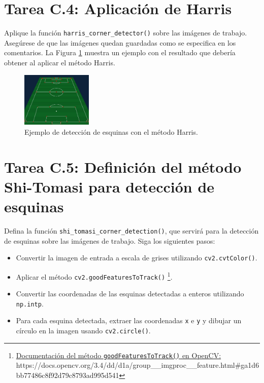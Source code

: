 \section*{Tarea C.4: Aplicación de Harris}
Aplique la función \texttt{harris\_corner\_detector()} sobre las imágenes de trabajo. Asegúrese de que las imágenes quedan guardadas como se especifica en los comentarios. La Figura \ref{fig:ejemplo_harris} muestra un ejemplo con el resultado que debería obtener al aplicar el método Harris.

\begin{figure}[H]
    \centering
    \includegraphics[width=0.3\textwidth]{Lab_3/template/figures/Harris_football.jpg}
    \caption{Ejemplo de detección de esquinas con el método Harris.}
    \label{fig:ejemplo_harris}
\end{figure}


\section*{Tarea C.5: Definición del método  Shi-Tomasi para detección de esquinas}
Defina la función \texttt{shi\_tomasi\_corner\_detection()}, que servirá para la detección de esquinas sobre las imágenes de trabajo. Siga los siguientes pasos:

\begin{itemize}
    \item Convertir la imagen de entrada a escala de grises utilizando \texttt{cv2.cvtColor()}.
    \item Aplicar el método \texttt{cv2.goodFeaturesToTrack()} \footnote{ \href{https://docs.opencv.org/3.4/dd/d1a/group\_\_imgproc\_\_feature.html\#ga1d6bb77486c8f92d79c8793ad995d541}{Documentación del método \texttt{goodFeaturesToTrack()} en OpenCV:} \\{https://docs.opencv.org/3.4/dd/d1a/group\_\_imgproc\_\_feature.html\#ga1d6bb77486c8f92d79c8793ad995d541}}.
    \item Convertir las coordenadas de las esquinas detectadas a enteros utilizando \texttt{np.intp}.
    \item Para cada esquina detectada, extraer las coordenadas \texttt{x} e \texttt{y} y dibujar un círculo en la imagen usando \texttt{cv2.circle()}.
\end{itemize}


